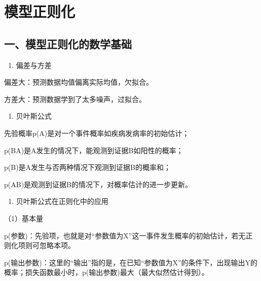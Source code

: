 \setcounter{section}{0}

\hypertarget{ux6a21ux578bux6b63ux5219ux5316}{%
\section{模型正则化}\label{ux6a21ux578bux6b63ux5219ux5316}}

\hypertarget{ux4e00ux6a21ux578bux6b63ux5219ux5316ux7684ux6570ux5b66ux57faux7840}{%
\subsection{一、模型正则化的数学基础}\label{ux4e00ux6a21ux578bux6b63ux5219ux5316ux7684ux6570ux5b66ux57faux7840}}

\begin{enumerate}
\def\labelenumi{\arabic{enumi}.}
\tightlist
\item
  偏差与方差
\end{enumerate}

偏差大：预测数据均值偏离实际均值，欠拟合。

方差大：预测数据学到了太多噪声，过拟合。

\begin{enumerate}
\def\labelenumi{\arabic{enumi}.}
\setcounter{enumi}{1}
\tightlist
\item
  贝叶斯公式
\end{enumerate}

先验概率p(A)是对一个事件概率如疾病发病率的初始估计；

p(B\textbar A)是A发生的情况下，能观测到证据B如阳性的概率；

p(B)是A发生与否两种情况下观测到证据B的概率和；

p(A\textbar B)是观测到证据B的情况下，对概率估计的进一步更新。

\begin{enumerate}
\def\labelenumi{\arabic{enumi}.}
\setcounter{enumi}{2}
\tightlist
\item
  贝叶斯公式在正则化中的应用
\end{enumerate}

（1）基本量

p(参数)：先验项，也就是对``参数值为X''这一事件发生概率的初始估计，若无正则化项则可忽略本项。

p(输出\textbar 参数)：这里的``输出''指的是，在已知``参数值为X''的条件下，出现输出Y的概率；损失函数最小时，p(输出\textbar 参数)最大（最大似然估计得到）。


